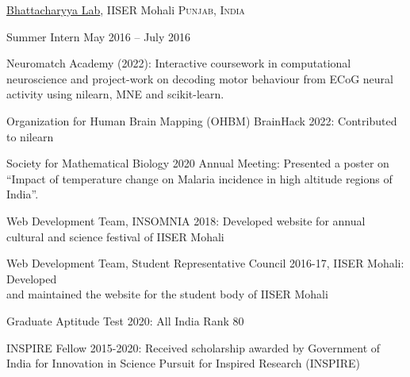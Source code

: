 \documentclass[11pt,a4paper]{article} %
\begin{document}

\headedsection %
{\href{https://sites.google.com/site/drsamarjitbh/}{Bhattacharyya Lab}, IISER Mohali}
{\textsc{Punjab, India}} {

\headedsubsection %
{Summer Intern}
{May 2016 -- July 2016}
{}
}


\spacedhrule{.5em}{-0.4em} %


\inlineheadsection 
{Neuromatch Academy (2022):}
{Interactive coursework in computational neuroscience and project-work on decoding motor behaviour from ECoG neural activity using nilearn, MNE and scikit-learn.}

\inlineheadsection
{Organization for Human Brain Mapping (OHBM) BrainHack 2022:} 
{Contributed to nilearn}

\inlineheadsection
{Society for Mathematical Biology 2020 Annual Meeting:}
{Presented a poster on “Impact of temperature change on Malaria incidence in high altitude regions of India”.}

\inlineheadsection
{Web Development Team, INSOMNIA 2018:} 
{Developed website for annual cultural and science festival of IISER Mohali}

\inlineheadsection
{Web Development Team, Student Representative Council 2016-17, IISER Mohali:}
{Developed \\and maintained the website for the student body of IISER Mohali}

\spacedhrule{1.5em}{-0.4em}

\inlineheadsection 
{Graduate Aptitude Test 2020:}
{All India Rank 80}

\inlineheadsection
{INSPIRE Fellow 2015-2020:}
{Received scholarship awarded by Government of India for Innovation in Science Pursuit for Inspired Research (INSPIRE)}
\end{document}
